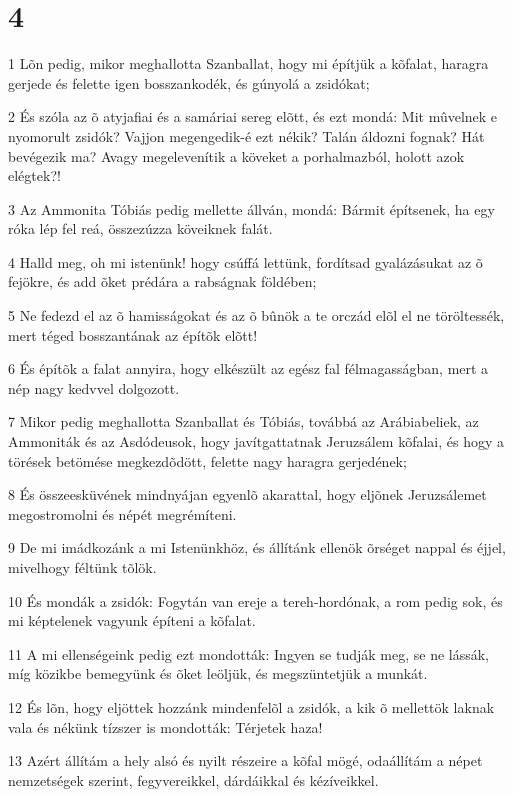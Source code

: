 \chapter{4}

\par 1 Lõn pedig, mikor meghallotta Szanballat, hogy mi építjük a kõfalat, haragra gerjede és felette igen bosszankodék, és gúnyolá a zsidókat;
\par 2 És szóla az õ atyjafiai és a samáriai sereg elõtt, és ezt mondá: Mit mûvelnek e nyomorult zsidók? Vajjon megengedik-é ezt nékik? Talán áldozni fognak? Hát bevégezik ma? Avagy megelevenítik a köveket a porhalmazból, holott azok elégtek?!
\par 3 Az Ammonita Tóbiás pedig mellette állván, mondá: Bármit építsenek, ha egy róka lép fel reá, összezúzza köveiknek falát.
\par 4 Halld meg, oh mi istenünk! hogy csúffá lettünk, fordítsad gyalázásukat az õ fejökre, és add õket prédára a rabságnak földében;
\par 5 Ne fedezd el az õ hamisságokat és az õ bûnök a te orczád elõl el ne töröltessék, mert téged bosszantának az építõk elõtt!
\par 6 És építõk a falat annyira, hogy elkészült az egész fal félmagasságban, mert a nép nagy kedvvel dolgozott.
\par 7 Mikor pedig meghallotta Szanballat és Tóbiás, továbbá az Arábiabeliek, az Ammoniták és az Asdódeusok, hogy javítgattatnak Jeruzsálem kõfalai, és hogy a törések betömése megkezdõdött, felette nagy haragra gerjedének;
\par 8 És összeesküvének mindnyájan egyenlõ akarattal, hogy eljõnek Jeruzsálemet megostromolni és népét megrémíteni.
\par 9 De mi imádkozánk a mi Istenünkhöz, és állítánk ellenök õrséget nappal és éjjel, mivelhogy féltünk tõlök.
\par 10 És mondák a zsidók: Fogytán van ereje a tereh-hordónak, a rom pedig sok, és mi képtelenek vagyunk építeni a kõfalat.
\par 11 A mi ellenségeink pedig ezt mondották: Ingyen se tudják meg, se ne lássák, míg közikbe bemegyünk és õket leöljük, és megszüntetjük a munkát.
\par 12 És lõn, hogy eljöttek hozzánk mindenfelõl a zsidók, a kik õ mellettök laknak vala és nékünk tízszer is mondották: Térjetek haza!
\par 13 Azért állítám a hely alsó és nyilt részeire a kõfal mögé, odaállítám a népet nemzetségek szerint, fegyvereikkel, dárdáikkal és kézíveikkel.

